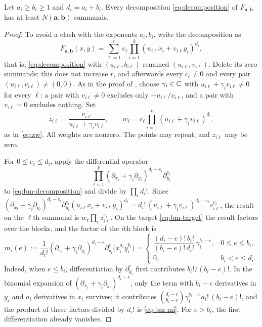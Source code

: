 \begin{proposition}\label{prop:bm-reduction}
Let $a_i\ge b_i\ge1$ and $d_i=a_i+b_i$. Every decomposition
\eqref{eq:decomposition} of $F_{\mathbf a,\mathbf b}$ has at least
$N(\mathbf a,\mathbf b)$ summands.
\end{proposition}
\begin{proof}
To avoid a clash with the exponents $a_i,b_i$, write the decomposition
as
\begin{equation}\label{eq:bm-decomposition}
F_{\mathbf a,\mathbf b}(x,y)=\sum_{\ell=1}^r c_\ell
\prod_{i=1}^k(u_{i\ell}x_i+v_{i\ell}y_i)^{d_i},
\end{equation}
that is, \eqref{eq:decomposition} with $(a_{i\ell},b_{i\ell})$ renamed
$(u_{i\ell},v_{i\ell})$. Delete its zero summands; this does not
increase $r$, and afterwards every $c_\ell\ne0$ and every pair
$(u_{i\ell},v_{i\ell})\ne(0,0)$. As in the proof of
, choose $\gamma_i\in\mathbb C$ with
$u_{i\ell}+\gamma_iv_{i\ell}\ne0$ for every $\ell$: a pair with
$v_{i\ell}\ne0$ excludes only $-u_{i\ell}/v_{i\ell}$, and a pair with
$v_{i\ell}=0$ excludes nothing. Set
\begin{equation}\label{eq:bm-zw}
z_{i\ell}=\frac{v_{i\ell}}{u_{i\ell}+\gamma_iv_{i\ell}},
\qquad
w_\ell=c_\ell\prod_{i=1}^k(u_{i\ell}+\gamma_iv_{i\ell})^{d_i},
\end{equation}
as in \eqref{eq:zw}. All weights are nonzero. The points may repeat,
and $z_{i\ell}$ may be zero.

For $0\le e_i\le d_i$, apply the differential operator
\[
\prod_{i=1}^k(\partial_{x_i}+\gamma_i\partial_{y_i})^{d_i-e_i}
\partial_{y_i}^{e_i}
\]
to \eqref{eq:bm-decomposition} and divide by $\prod_id_i!$. Since
$(\partial_{x_i}+\gamma_i\partial_{y_i})^{d_i-e_i}\partial_{y_i}^{e_i}
(u_{i\ell}x_i+v_{i\ell}y_i)^{d_i}
=d_i!\,(u_{i\ell}+\gamma_iv_{i\ell})^{d_i-e_i}v_{i\ell}^{e_i}$,
the result on the $\ell$th summand is $w_\ell\prod_iz_{i\ell}^{e_i}$.
On the target \eqref{eq:bm-target} the result factors over the blocks,
and the factor of the $i$th block is
\begin{equation}\label{eq:bm-mi}
m_i(e):=\frac{1}{d_i!}
(\partial_{x_i}+\gamma_i\partial_{y_i})^{d_i-e}\partial_{y_i}^{e}
\bigl(x_i^{a_i}y_i^{b_i}\bigr)
=\begin{cases}
\dfrac{(d_i-e)!\,b_i!}{(b_i-e)!\,d_i!}\,\gamma_i^{b_i-e},
&0\le e\le b_i,\\[8pt]
0,&b_i<e\le d_i.
\end{cases}
\end{equation}
Indeed, when $e\le b_i$, differentiation by $\partial_{y_i}^{e}$ first
contributes $b_i!/(b_i-e)!$. In the binomial expansion of
$(\partial_{x_i}+\gamma_i\partial_{y_i})^{d_i-e}$, only the term with
$b_i-e$ derivatives in $y_i$ and $a_i$ derivatives in $x_i$ survives;
it contributes $\binom{d_i-e}{b_i-e}\gamma_i^{b_i-e}a_i!\,(b_i-e)!$,
and the product of these factors divided by $d_i!$ is
\eqref{eq:bm-mi}. For $e>b_i$, the first differentiation already
vanishes.


\end{proof}
